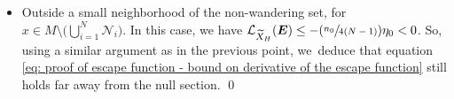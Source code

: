 \documentclass[JEP,XML,SOM,Unicode,NoEqCountersInSection,NoFloatCountersInSection,published]{cedram}
\newcommand{\ro}{\mathrm{o}}
\newcommand{\rs}{\mathrm{s}}
\newcommand{\ru}{\mathrm{u}}
\newcommand{\Psfrac}[2]{(\sfrac{#1}{#2})}
\theoremstyle{definition}
\theoremstyle{plain}
\newcommand{\Lie}{\mathcal{L}}
\newcommand{\Ncal}{\mathcal{N}}
\newcommand{\w}[1]{\langle {#1} \rangle}
\DeclareMathOperator{\Cone}{Cone}
\DeclareMathOperator{\E}{\boldsymbol{E}}
\begin{document}
\begin{itemize}
\[
\Lie_{X_H} (G_m) = \Lie_{\widetilde{X}_H} (\E) \log \w{ |\xi| C_1} + C_2.
\]
Moreover, according to the construction of $\E$, one can find a positive constant $\eta > 0$ such that $ \Lie_{\widetilde{X}_H} (\E) (x,\tilde{\xi}) < - \eta < 0$. Therefore, there exists a positive radius $R > 0$ such that, for every $(x,\xi)$ in the set $T^*M \setminus \left(\Cone (\Ncal^\rs) \cup \Cone (\Ncal^\ro) \cup \Cone (\Ncal^\ru) \right)$ with $x \in \bigcup_{1 \leq i \leq N} \Ncal_i$ and $|\xi| \geq R$, we~have
\begin{equation}\label{eq: proof of escape function - bound on derivative of the escape function}
\Lie_{X_H} (G_m) \leq - \gamma \min(s, |u|).
\end{equation}
Therefore, we~define $C_m:= \gamma \min(s, |u|) $.
\item Outside a small neighborhood of the non-wandering set, \ie for $x \!\in\! M\!\setminus\! \bigl(\bigcup_{i = 1}^N \Ncal_i \bigr)$. In this case, we have $ \Lie_{\widetilde{X}_H} (\E) \leq - \Psfrac{n_0}{4 (N-1)}\eta_0 < 0$. So, using a similar argument as in the previous point, we~deduce that equation \eqref{eq: proof of escape function - bound on derivative of the escape function} still holds far away from the null section. \qed
\end{itemize}
\end{document}
